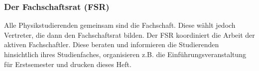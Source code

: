\subsubsection{Der Fachschaftsrat (FSR)}
Alle Physikstudierenden gemeinsam sind die Fachschaft. Diese wählt jedoch Vertreter, die dann den Fachschaftsrat bilden. Der FSR koordiniert die Arbeit der aktiven Fachschaftler. Diese beraten und informieren die Studierenden hinsichtlich ihres Studienfaches, organisieren z.B. die Einführungsveranstaltung für Erstsemester und drucken dieses Heft.
